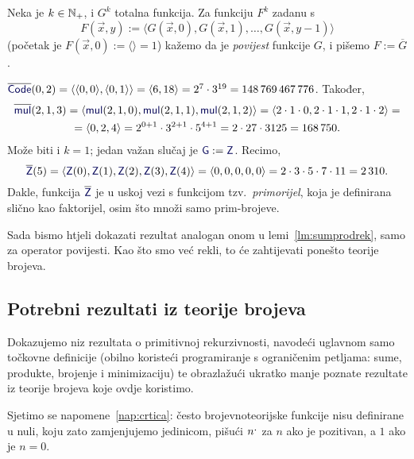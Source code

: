 \begin{definicija}[{name=[povijest totalne brojevne funkcije]}]
Neka je $k\in{\mathbb N}_+$, i $G^k$ totalna funkcija. Za funkciju $F^k$ zadanu s
\begin{equation}\label{eq:povijest}
    F(\vec x,y):=\langle G(\vec x,0),G(\vec x,1),\dotsc,G(\vec x,y-1)\rangle
\end{equation}
(početak je $F(\vec x,0):=\langle\rangle=1$) kažemo da je \emph{povijest} funkcije $G$, i pišemo $F:=\overline G$.
\end{definicija}

\begin{primjer}[{name=[primorijel kao povijest nulfunkcije]}]\label{pr:primorijel}
$\overline{\f{Code}}(0,2)=\kr{\kr{0,0},\kr{0,1}}=\kr{6,18}=2^7\cdot3^{19}=148\,769\,467\,776$. Također,
\begin{multline}
    \overline{\f{mul}}(2,1,3)=\langle\f{mul}(2,1,0),\f{mul}(2,1,1),\f{mul}(2,1,2)\rangle=\langle2\cdot1\cdot0,2\cdot1\cdot1,2\cdot1\cdot2\rangle=\\
    =\langle0,2,4\rangle=2^{0+1}\cdot3^{2+1}\cdot5^{4+1}=2\cdot27\cdot3125=168\,750.
\end{multline}
Može biti i $k=1$; jedan važan slučaj je $\f G:=\f Z$. Recimo,
\begin{equation}
    \overline{\f Z}(5)=\langle\f Z(0),\f Z(1),\f Z(2),\f Z(3),\f Z(4)\rangle=\langle0,0,0,0,0\rangle=2\cdot3\cdot5\cdot7\cdot11=2\,310.
\end{equation}
Dakle, funkcija $\overline{\f Z}$ je u uskoj vezi s funkcijom tzv.\ \emph{primorijel}, koja je definirana slično kao faktorijel, osim što množi samo prim-brojeve. 
\end{primjer}

Sada bismo htjeli dokazati rezultat analogan onom u lemi~\ref{lm:sumprodrek}, samo za operator povijesti. Kao što smo već rekli, to će zahtijevati ponešto teorije brojeva.

\subsection{Potrebni rezultati iz teorije brojeva}\label{sec:teobroj}

Dokazujemo niz rezultata o primitivnoj rekurzivnosti, navodeći uglavnom samo toč\-kov\-ne definicije (obilno koristeći programiranje s ograničenim petljama: sume, produkte, brojenje i minimizaciju) te obrazlažući ukratko manje poznate rezultate iz teorije brojeva koje ovdje koristimo.

Sjetimo se napomene~\ref{nap:crtica}: često brojevnoteorijske funkcije nisu definirane u nuli, koju zato zamjenjujemo jedinicom, pišući $n\sp{\text{\normalsize.}}$ za $n$ ako je pozitivan, a $1$ ako je $n=0$.


